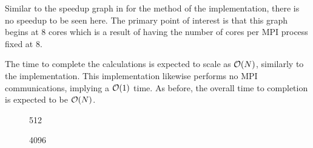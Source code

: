 %

%
%
\begin{figure}[!h]
    
    \caption{
        \vZeroSpeedupCaption
            {\sharedandreplicateddata{}}
            {\individualoperation{}}
    }
    \label{fig:v1_shared_and_replicated_data_individual_operation_speedups}
\end{figure}


\vZeroSpeedupExplanation
    {}
    {\sharedandreplicateddata{}}
    {\individualoperation{}}

Similar to the speedup graph in
for the \individualoperation{} method of the \replicateddata{}
implementation, there is no speedup to be seen here.
%
The primary point of interest is that this graph begins at 8 cores
which is a result of having the number of \openmp{} cores per
MPI process fixed at 8.

%
The time to complete the calculations is expected to scale as $\mathcal{O}{\left({ N }\right)}$,
similarly to the \replicateddata{} implementation.
%
This implementation likewise performs no MPI communications, implying a
$\mathcal{O}{\left({ 1 }\right)}$ time.
%
As before, the overall time to completion is expected to be $\mathcal{O}{\left({ N }\right)}$.

%
%
\begin{figure}[!h]
    
    \caption{
        \vOneSRTimeCaption
            {\sharedandreplicateddata{}}
            {\individualoperation{}}
            {512}
    }
    \label{fig:v1_shared_and_replicated_individual_operation_512_time}
\end  {figure}

\begin{figure}[!h]
    
    \caption{
        \vOneSRTimeCaption
            {\sharedandreplicateddata{}}
            {\individualoperation{}}
            {4096}
    }
    \label{fig:v1_shared_and_replicated_individual_operation_4096_time}
\end  {figure}

